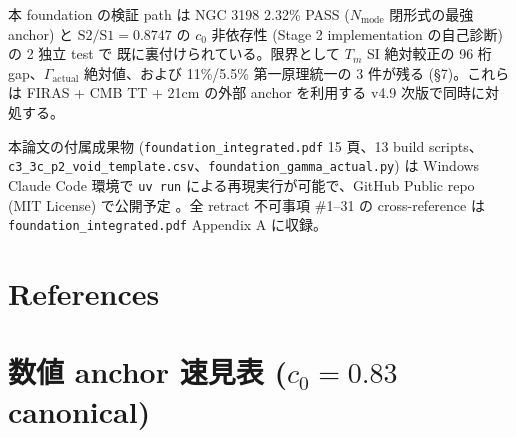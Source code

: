 \documentclass[11pt,a4paper]{ltjsarticle}
\newcommand{\Tm}{T_{m}}
\newcommand{\Nmode}{N_{\mathrm{mode}}}
\newcommand{\Gammaact}{\Gamma_{\mathrm{actual}}}
\begin{document}
本 foundation の検証 path は NGC 3198 2.32\% PASS ($\Nmode$ 閉形式の最強 anchor) と
$\mathrm{S2/S1} = 0.8747$ の $c_0$ 非依存性 (Stage 2 implementation の自己診断) の 2 独立 test で
既に裏付けられている。限界として $\Tm$ SI 絶対較正の 96 桁 gap、$\Gammaact$ 絶対値、および
11\%/5.5\% 第一原理統一の 3 件が残る (\S 7)。これらは FIRAS + CMB TT + 21cm の外部 anchor を利用する
v4.9 次版で同時に対処する。

\begin{sloppypar}
本論文の付属成果物 (\texttt{foundation\_integrated.pdf} 15 頁、13 build scripts、
\texttt{c3\_3c\_p2\_void\_template.csv}、\texttt{foundation\_gamma\_actual.py}) は Windows Claude Code
環境で \texttt{uv run} による再現実行が可能で、GitHub Public repo (MIT License) で公開予定
\citep{Sakaguchi2026b}。全 retract 不可事項 \#1--31 の cross-reference は
\texttt{foundation\_integrated.pdf} Appendix A に収録。
\end{sloppypar}

\section*{References}



\clearpage
\appendix
\section{数値 anchor 速見表 ($c_0 = 0.83$ canonical)}
\end{document}
